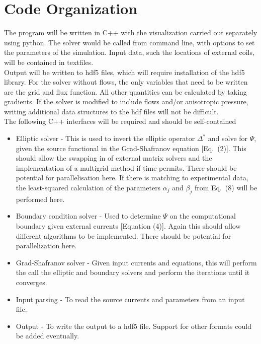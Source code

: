 \documentclass[paper=a4, fontsize=11pt]{scrartcl} %
\begin{document}
\section{Code Organization}

The program will be written in C++ with the visualization carried out separately using python. The solver would be called from command line, with options to set the parameters of the simulation. Input data, such the locations of external coils, will be contained in textfiles. 
\\

Output will be written to  hdf5 files, which will require installation of the hdf5 library. For the solver without flows, the only variables that need to be written are the grid and flux function. All other quantities can be calculated by taking gradients. If the solver is modified to include flows and/or anisotropic pressure, writing additional data structures to the hdf files will not be difficult. \\

The following C++ interfaces will be required and should be self-contained
\begin{itemize}
\item Elliptic solver - This is used to invert the elliptic operator $\Delta^*$ and solve for $\Psi$, given the source functional in the Grad-Shafranov equation [Eq.~(2)]. This should allow the swapping in of external matrix solvers and the implementation of a multigrid method if time permits. There should be potential for parallelisation here. If there is matching to experimental data, the least-squared calculation of the parameters $\alpha_j$ and $\beta_j$ from Eq.~(8) will be performed here. 
\item Boundary condition solver - Used to determine $\Psi$ on the computational boundary given external currents [Equation (4)]. Again this should allow different algorithms to be implemented. There should be potential for parallelization here. 
\item Grad-Shafranov solver - Given input currents and equations, this will perform the call the elliptic and boundary solvers and perform the iterations until it converges.
\item Input parsing - To read the source currents and parameters from an input file.
\item Output - To write the output to a hdf5 file. Support for other formats could be added eventually.
\end{itemize}
\end{document}
